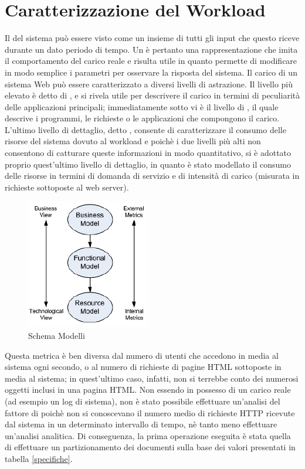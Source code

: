 \chapter{Caratterizzazione del Workload}
Il  del sistema può essere visto come un insieme di tutti gli input che questo riceve durante un dato periodo di tempo. Un  è pertanto una rappresentazione che imita il comportamento del carico reale e risulta utile in quanto permette di modificare in modo semplice i parametri per osservare la risposta del sistema. Il carico di un sistema Web può essere caratterizzato a diversi livelli di astrazione. Il livello più elevato è detto di , e si rivela utile per descrivere il carico in termini di peculiarità delle applicazioni principali; immediatamente sotto vi è il livello di , il quale descrive i programmi, le richieste o le applicazioni che compongono il carico. L'ultimo livello di dettaglio, detto , consente di caratterizzare il consumo delle risorse del sistema dovuto al workload e poichè i due livelli più alti non consentono di catturare queste informazioni in modo quantitativo, si è adottato proprio quest'ultimo livello di dettaglio, in quanto è stato modellato il consumo delle risorse in termini di domanda di servizio e di intensità di carico (misurata in richieste  sottoposte al web server). 
\begin{figure}[H]
\begin{center}
\includegraphics[scale=1.2]{etc/schema3.png}
\caption{Schema Modelli}
\label{schema3}
\end{center}
\end{figure}
Questa metrica è ben diversa dal numero di utenti che accedono in media al sistema ogni secondo, o al numero di richieste di pagine HTML sottoposte in media al sistema; in quest'ultimo caso, infatti, non si terrebbe conto dei numerosi oggetti inclusi in una pagina HTML. 
Non essendo in possesso di un carico reale (ad esempio un log di sistema), non è stato possibile effettuare un'analisi del fattore di  poichè non si conoscevano il numero medio di richieste HTTP ricevute dal sistema in un determinato intervallo di tempo, nè tanto meno effettuare un'analisi analitica. Di conseguenza, la prima operazione eseguita è stata quella di effettuare un partizionamento dei documenti sulla base dei valori presentati in tabella \ref{specifiche}.
